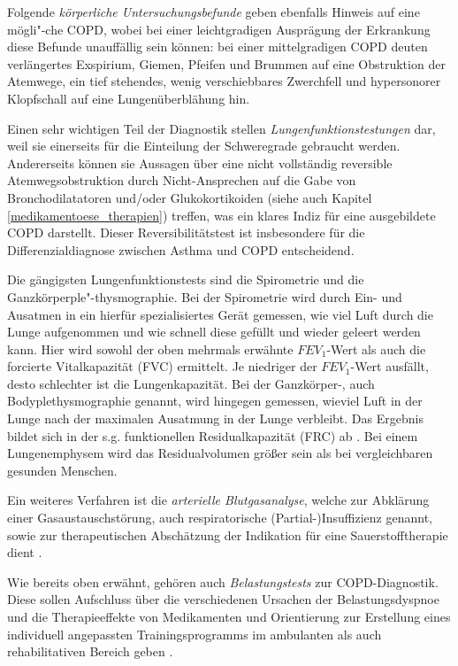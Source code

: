 Folgende \emph{körperliche Untersuchungsbefunde} geben ebenfalls Hinweis auf eine mögli"-che COPD, wobei bei einer leichtgradigen Ausprägung der Erkrankung diese Befunde unauffällig sein können: bei einer mittelgradigen COPD deuten verlängertes Exspirium, Giemen, Pfeifen und Brummen auf eine Obstruktion der Atemwege, ein tief stehendes, wenig verschiebbares Zwerchfell und hypersonorer Klopfschall auf eine Lungenüberblähung hin. 

Einen sehr wichtigen Teil der Diagnostik stellen \emph{Lungenfunktionstestungen} dar, weil sie einerseits für die Einteilung der Schweregrade gebraucht werden. Andererseits können sie Aussagen über eine nicht vollständig reversible Atemwegsobstruktion durch Nicht-Ansprechen auf die Gabe von Bronchodilatatoren und/oder Glukokortikoiden (siehe auch Kapitel \ref{medikamentoese_therapien}) treffen, was ein klares Indiz für eine ausgebildete COPD darstellt. Dieser Reversibilitätstest ist insbesondere für die Differenzialdiagnose zwischen Asthma und COPD entscheidend. 

Die gängigsten Lungenfunktionstests sind die Spirometrie und die Ganzkörperple"-thysmographie. Bei der Spirometrie wird durch Ein- und Ausatmen in ein hierfür spezialisiertes Gerät gemessen, wie viel Luft durch die Lunge aufgenommen und wie schnell diese gefüllt und wieder geleert werden kann. Hier wird sowohl der oben mehrmals erwähnte $FEV_{1}$-Wert als auch die forcierte Vitalkapazität (FVC) ermittelt. Je niedriger der $FEV_{1}$-Wert ausfällt, desto schlechter ist die Lungenkapazität. Bei der Ganzkörper-, auch Bodyplethysmographie genannt, wird hingegen gemessen, wieviel Luft in der Lunge nach der maximalen Ausatmung in der Lunge verbleibt. Das Ergebnis bildet sich in der s.g. funktionellen Residualkapazität (FRC) ab \autocite[vgl.][e6f.]{vogelmeier2007}. Bei einem Lungenemphysem wird das Residualvolumen größer sein als bei vergleichbaren gesunden Menschen. 

Ein weiteres Verfahren ist die \emph{arterielle Blutgasanalyse}, welche zur Abklärung einer Gasaustauschstörung, auch respiratorische (Partial-)Insuffizienz genannt, sowie zur therapeutischen Abschätzung der Indikation für eine Sauerstofftherapie dient \autocite[190]{welte2007}.

Wie bereits oben erwähnt, gehören auch \emph{Belastungstests} zur COPD-Diagnostik. Diese sollen Aufschluss über die verschiedenen Ursachen der Belastungsdyspnoe und die Therapieeffekte von Medikamenten und Orientierung zur Erstellung eines individuell angepassten Trainingsprogramms im ambulanten als auch rehabilitativen Bereich geben \autocite[vgl.][e7]{vogelmeier2007}. 

